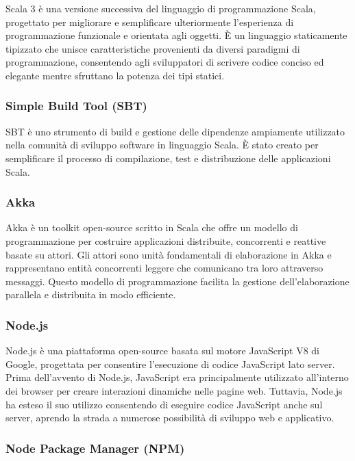 \documentclass{scrartcl}
\begin{document}
Scala 3 è una versione successiva del linguaggio di programmazione Scala, progettato per migliorare e semplificare ulteriormente l'esperienza di programmazione funzionale e orientata agli oggetti. È un linguaggio staticamente tipizzato che unisce caratteristiche provenienti da diversi paradigmi di programmazione, consentendo agli sviluppatori di scrivere codice conciso ed elegante mentre sfruttano la potenza dei tipi statici.

\subsubsection{Simple Build Tool (SBT)}

SBT\cite{sbt} è uno strumento di build e gestione delle dipendenze ampiamente utilizzato nella comunità di sviluppo software in linguaggio Scala. È stato creato per semplificare il processo di compilazione, test e distribuzione delle applicazioni Scala.

\subsubsection{Akka}

Akka è un toolkit open-source scritto in Scala che offre un modello di programmazione per costruire applicazioni distribuite, concorrenti e reattive basate su attori. Gli attori sono unità fondamentali di elaborazione in Akka e rappresentano entità concorrenti leggere che comunicano tra loro attraverso messaggi. Questo modello di programmazione facilita la gestione dell'elaborazione parallela e distribuita in modo efficiente.

\subsubsection{Node.js}

Node.js\cite{nodejs} è una piattaforma open-source basata sul motore JavaScript V8 di Google, progettata per consentire l'esecuzione di codice JavaScript lato server. Prima dell'avvento di Node.js, JavaScript era principalmente utilizzato all'interno dei browser per creare interazioni dinamiche nelle pagine web. Tuttavia, Node.js ha esteso il suo utilizzo consentendo di eseguire codice JavaScript anche sul server, aprendo la strada a numerose possibilità di sviluppo web e applicativo.

\subsubsection{Node Package Manager (NPM)}
\end{document}
